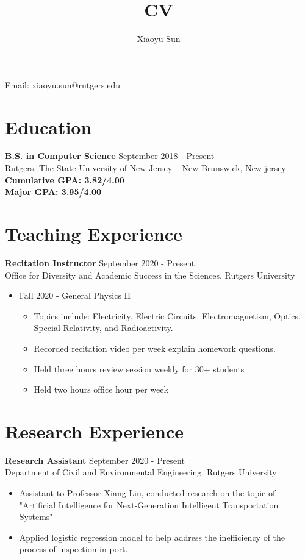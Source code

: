 \documentclass{article}
\makeatletter
\renewcommand{\maketitle}{
\begin{center}
{\huge\bfseries
\theauthor}

\vspace{.25em}

Email: xiaoyu.sun@rutgers.edu\\
\end{center}
}
\makeatother
\begin{document}
\title{CV}
\author{Xiaoyu Sun}
\maketitle

\section{Education}
\textbf{B.S. in Computer Science} \space 
\hfill{September 2018 - Present}\\
Rutgers, The State University of New Jersey – New Brunswick, New jersey \\
\textbf{Cumulative GPA: 3.82/4.00}\\
\textbf{Major GPA: 3.95/4.00}


\section{Teaching Experience}
\textbf{Recitation Instructor}
\hfill{September 2020 - Present}\\
Office for Diversity and Academic Success in the Sciences, Rutgers University
\begin{itemize}
  \item Fall 2020 - General Physics II
  \begin{itemize}
  	\item Topics include: Electricity, Electric Circuits, Electromagnetism, Optics, Special Relativity, and Radioactivity.
     \item Recorded recitation video per week explain homework questions.
     \item Held three hours review session weekly for 30+ students
 	 \item Held two hours office hour per week
  \end{itemize}
\end{itemize}


\section{Research Experience}
\textbf{Research Assistant}
\hfill{September 2020 - Present}\\
Department of Civil and Environmental Engineering, Rutgers University
\begin{itemize}
  \itemsep0em
  \item Assistant to Professor Xiang Liu, conducted research on the topic of "Artificial Intelligence for Next-Generation Intelligent Transportation Systems"
  \item Applied logistic regression model to help address the inefficiency of the process of inspection in port.
\end{itemize}
\end{document}
